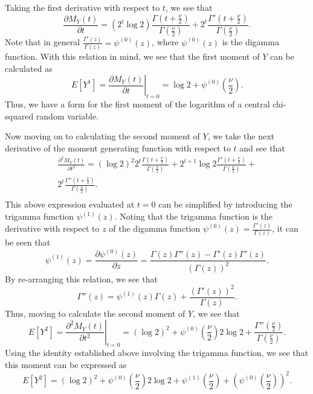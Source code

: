 Taking the first derivative with respect to $t$, we see that
\begin{equation*}
	\frac{\partial M_Y(t)}{\partial t} = (2^t \log 2) \frac{\Gamma (t + \frac{\nu}{2})}{\Gamma (\frac{\nu}{2})} + 2^t \frac{\Gamma ' (t + \frac{\nu}{2})}{\Gamma (\frac{\nu}{2})} .
\end{equation*}
Note that in general $\frac{\Gamma ' (z)}{\Gamma (z)} = \psi^{(0)}(z)$, where $\psi^{(0)}(z)$ is the digamma function. With this relation in mind, we see that the first moment of
$Y$ can be calculated as
\begin{equation*}
	E \left[ Y^1 \right] =  \left. \frac{\partial M_Y(t)}{\partial t} \right|_{t=0} = \log 2 + \psi^{(0)} \left( \frac{\nu}{2} \right) .
\end{equation*}
Thus, we have a form for the first moment of the logarithm of a central chi-squared random variable.

Now moving on to calculating the second moment of $Y$, we take the next derivative of the moment generating function with respect to $t$ and see that
\begin{equation*}
	\begin{split}
		\frac{\partial^2 M_Y(t)}{\partial t^2} = (\log 2)^2 2^t  \frac{\Gamma (t + \frac{\nu}{2})}{\Gamma (\frac{\nu}{2})} + 2^{t+1} \log 2 \frac{\Gamma ' (t + \frac{\nu}{2})}{\Gamma (\frac{\nu}{2})} + \\ 
		2^t \frac{\Gamma '' (t + \frac{\nu}{2})}{\Gamma (\frac{\nu}{2})} .\\
	\end{split}
\end{equation*}
This above expression evaluated at $t = 0$ can be simplified by introducing the trigamma function $ \psi^{(1)}(z)$. Noting that the trigamma function is the derivative with respect
to $z$ of the digamma function $\psi^{(0)}(z) = \frac{\Gamma ' (z)}{\Gamma (z)}$, it can be seen that
\begin{equation*}
	\psi^{(1)}(z) = \frac{\partial \psi^{(0)}(z)}{\partial z} = \frac{\Gamma (z) \Gamma '' (z) - \Gamma '(z) \Gamma '(z)}{(\Gamma(z))^2} .
\end{equation*}
By re-arranging this relation, we see that
\begin{equation*}
	\Gamma ''(z) = \psi^{(1)}(z) \Gamma(z) + \frac{(\Gamma '(z))^2}{\Gamma(z)} .
\end{equation*}
Thus, moving to calculate the second moment of $Y$, we see that
\begin{equation*}
	E \left[ Y^2 \right] =  \left. \frac{\partial^2 M_Y(t)}{\partial t^2} \right|_{t=0} =
	(\log 2)^2 + \psi^{(0)} \left( \frac{\nu}{2} \right) 2 \log 2  + \frac{\Gamma '' (\frac{\nu}{2})}{\Gamma (\frac{\nu}{2})} .
\end{equation*}
Using the identity established above involving the trigamma function, we see that this moment can be expressed as
\begin{equation*}
	E \left[ Y^2 \right] =
	(\log 2)^2 + \psi^{(0)} \left( \frac{\nu}{2} \right) 2 \log 2  + \psi^{(1)} \left( \frac{\nu}{2} \right) + \left( \psi^{(0)} \left( \frac{\nu}{2} \right) \right)^2 .
\end{equation*}

